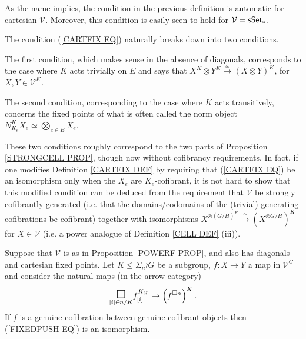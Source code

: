 \documentclass[a4paper,10pt]{article}%
\begin{document}
\begin{remark}
As the name implies, the condition in the previous definition is automatic for cartesian 
$\mathcal{V}$. Moreover, this condition is easily seen to hold for $\mathcal{V} = \mathsf{sSet}_{\**}$.

The condition (\ref{CARTFIX EQ}) naturally breaks down into two conditions.

The first condition, which makes sense in the absence of diagonals, corresponds to the case where $K$ acts trivially on $E$ and says that
$X^K \otimes Y^K \xrightarrow{\simeq} (X \otimes Y)^K$, for $X,Y \in \mathcal{V}^K$.

The second condition, corresponding to the case where $K$ acts transitively, 
concerns the fixed points of what is often called the norm object
$N_{K_e}^K X_e \simeq \bigotimes_{e \in E} X_e$.

These two conditions roughly correspond 
to the two parts of Proposition \ref{STRONGCELL PROP},
though now without cofibrancy requirements.
In fact, if one modifies
Definition \ref{CARTFIX DEF} 
by requiring that
(\ref{CARTFIX EQ})
be an isomorphism only when the
$X_e$ are $K_e$-cofibrant,
it is not hard to show that
this modified condition can be deduced from
the requirement that $\mathcal{V}$ be strongly
cofibrantly generated (i.e. that the domains/codomains of the (trivial) generating cofibrations be cofibrant)
together with
isomorphisms
$X^{\otimes (G/H)^K} \xrightarrow{\simeq} 
\left( X^{\otimes G/H} \right)^K$
for $X \in \mathcal{V}$
(i.e. a power analogue of 
Definition \ref{CELL DEF} (iii)).
\end{remark}


\begin{proposition}\label{FIXEDPUSH PROP}
	Suppose that $\mathcal{V}$ is as in Proposition \ref{POWERF PROP},
	and also has diagonals and cartesian fixed points.
	Let $K \leq \Sigma_n \wr G$ be a subgroup, 
	$f \colon X \to Y$ a map in $\mathcal{V}^G$ and consider the natural maps (in the arrow category)
\begin{equation}\label{FIXEDPUSH EQ}
	\underset{[i] \in n/K}{\mathlarger{\mathlarger{\square}}}
	f_{[i]}^{K_{[i]}}
\to
	\left( f^{\square n} \right)^K.
\end{equation}
If $f$ is a genuine cofibration between genuine cofibrant objects then 
(\ref{FIXEDPUSH EQ}) is an isomorphism.
\end{proposition}
\end{document}
